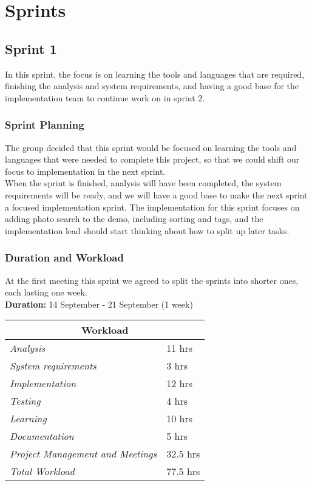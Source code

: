\usepackage{graphicx}
\usepackage{titlesec}
\usepackage{caption}
\usepackage[table]{xcolor}


\chapter{Sprints}

\newpage

\section{Sprint 1}
In this sprint, the focus is on learning the tools and languages that are required, finishing the analysis and system requirements, and having a good base for the implementation team to continue work on in sprint 2.

\subsection{Sprint Planning}
The group decided that this sprint would be focused on learning the tools and languages that were needed to complete this project, so that we could shift our focus to implementation in the next sprint. \\
\indent When the sprint is finished, analysis will have been completed, the system requirements will be ready, and we will have a good base to make the next sprint a focused implementation sprint. The implementation for this sprint focuses on adding photo search to the demo, including sorting and tags, and the implementation lead should start thinking about how to split up later tasks.

\subsection{Duration and Workload}
At the first meeting this sprint we agreed to split the sprints into shorter ones, each lasting one week. \\

\noindent \textbf{Duration: } 14 September - 21 September (1 week)\\
\begin{minipage}{\linewidth}
\setlength{\tabcolsep}{25pt}
\centering
{}
\begin{tabular}{ |l|l| }
	\hline
	\multicolumn{2}{|c|}{\cellcolor{gray!25} Workload} \\
	\hline
	\it{Analysis} & 11 hrs\\
	\it{System requirements} & 3 hrs\\
	\it{Implementation} & 12 hrs\\
	\it{Testing} & 4 hrs\\
	\it{Learning} & 10 hrs\\
	\it{Documentation} & 5 hrs\\
	\it{Project Management and Meetings} & 32.5 hrs\\
	\hline
	\it{Total Workload} & 77.5 hrs\\
	\hline
\end{tabular}
\end{minipage}


